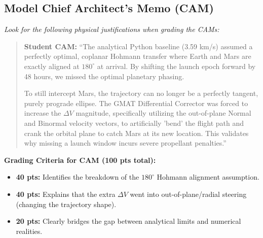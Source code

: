 \documentclass[11pt, letterpaper]{article}
\begin{document}
\subsection*{Model Chief Architect's Memo (CAM)}
\textit{Look for the following physical justifications when grading the CAMs:}

\begin{quote}
\textbf{Student CAM:} ``The analytical Python baseline (3.59 km/s) assumed a perfectly optimal, coplanar Hohmann transfer where Earth and Mars are exactly aligned at $180^\circ$ at arrival. By shifting the launch epoch forward by 48 hours, we missed the optimal planetary phasing. 

To still intercept Mars, the trajectory can no longer be a perfectly tangent, purely prograde ellipse. The GMAT Differential Corrector was forced to increase the $\Delta V$ magnitude, specifically utilizing the out-of-plane Normal and Binormal velocity vectors, to artificially 'bend' the flight path and crank the orbital plane to catch Mars at its new location. This validates why missing a launch window incurs severe propellant penalties.''
\end{quote}

\textbf{Grading Criteria for CAM (100 pts total):}
\begin{itemize}
    \item \textbf{40 pts:} Identifies the breakdown of the $180^\circ$ Hohmann alignment assumption.
    \item \textbf{40 pts:} Explains that the extra $\Delta V$ went into out-of-plane/radial steering (changing the trajectory shape).
    \item \textbf{20 pts:} Clearly bridges the gap between analytical limits and numerical realities.
\end{itemize}
\end{document}
